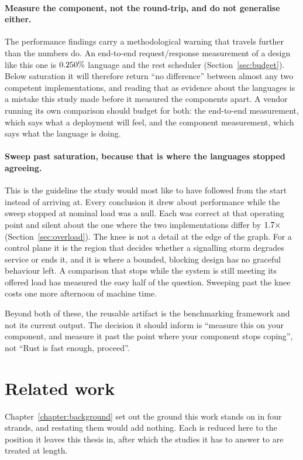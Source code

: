 \documentclass[english,oneside,a4paper,censored,csm,software-track-2020]{HYthesisML}
\begin{document}
\paragraph{Measure the component, not the round-trip, and do not generalise either.}
The performance findings carry a methodological warning that travels further than the
numbers do. An end-to-end request/response measurement of a design like this one is
$0.250\%$ language and the rest scheduler (Section~\ref{sec:budget}). Below
saturation it will therefore return ``no difference'' between almost any two competent
implementations, and reading that as evidence about the languages is a mistake this study made
before it measured the components apart. A vendor running its own comparison should budget for
both: the end-to-end measurement, which says what a deployment will feel, and the component
measurement, which says what the language is doing.

\paragraph{Sweep past saturation, because that is where the languages stopped agreeing.}
This is the guideline the study would most like to have followed from the start instead of
arriving at. Every conclusion it drew about performance while the sweep stopped at nominal load
was a null. Each was correct at that operating point and silent about the one where the two
implementations differ by $1.7\times$ (Section~\ref{sec:overload}). The knee is
not a detail at the edge of the graph. For a control plane it is the region that decides whether
a signalling storm degrades service or ends it, and it is where a bounded, blocking design has
no graceful behaviour left. A comparison that stops while the system is still meeting its
offered load has measured the easy half of the question. Sweeping past the knee costs one
more afternoon of machine time.

Beyond both of these, the reusable artifact is the benchmarking framework and not its current
output. The decision it should inform is ``measure this on your component, and measure it past
the point where your component stops coping'', not ``Rust is fast enough, proceed''.

\section{Related work}\label{sec:relatedwork}
Chapter~\ref{chapter:background} set out the ground this work stands on in four strands, and
restating them would add nothing. Each is reduced here to the position it leaves this thesis in,
after which the studies it has to answer to are treated at length.
\end{document}
